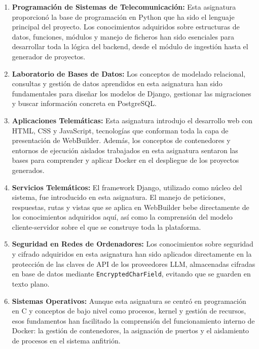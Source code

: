 \begin{enumerate}
  \item \textbf{Programación de Sistemas de Telecomunicación:} Esta asignatura proporcionó la base de programación en Python que ha sido el lenguaje principal del proyecto. Los conocimientos adquiridos sobre estructuras de datos, funciones, módulos y manejo de ficheros han sido esenciales para desarrollar toda la lógica del backend, desde el módulo de ingestión hasta el generador de proyectos.
  
  \item \textbf{Laboratorio de Bases de Datos:} Los conceptos de modelado relacional, consultas y gestión de datos aprendidos en esta asignatura han sido fundamentales para diseñar los modelos de Django, gestionar las migraciones y buscar información concreta en PostgreSQL.
  
  \item \textbf{Aplicaciones Telemáticas:} Esta asignatura introdujo el desarrollo web con HTML, CSS y JavaScript, tecnologías que conforman toda la capa de presentación de WebBuilder. Además, los conceptos de contenedores y entornos de ejecución aislados trabajados en esta asignatura sentaron las bases para comprender y aplicar Docker en el despliegue de los proyectos generados.
  
  \item \textbf{Servicios Telemáticos:} El framework Django, utilizado como núcleo del sistema, fue introducido en esta asignatura. El manejo de peticiones, respuestas, rutas y vistas que se aplica en WebBuilder bebe directamente de los conocimientos adquiridos aquí, así como la comprensión del modelo cliente-servidor sobre el que se construye toda la plataforma.
  
  \item \textbf{Seguridad en Redes de Ordenadores:} Los conocimientos sobre seguridad y cifrado adquiridos en esta asignatura han sido aplicados directamente en la protección de las claves de API de los proveedores LLM, almacenadas cifradas en base de datos mediante \texttt{EncryptedCharField}, evitando que se guarden en texto plano.
  
  \item \textbf{Sistemas Operativos:} Aunque esta asignatura se centró en programación en C y conceptos de bajo nivel como procesos, kernel y gestión de recursos, esos fundamentos han facilitado la comprensión del funcionamiento interno de Docker: la gestión de contenedores, la asignación de puertos y el aislamiento de procesos en el sistema anfitrión.
\end{enumerate}

